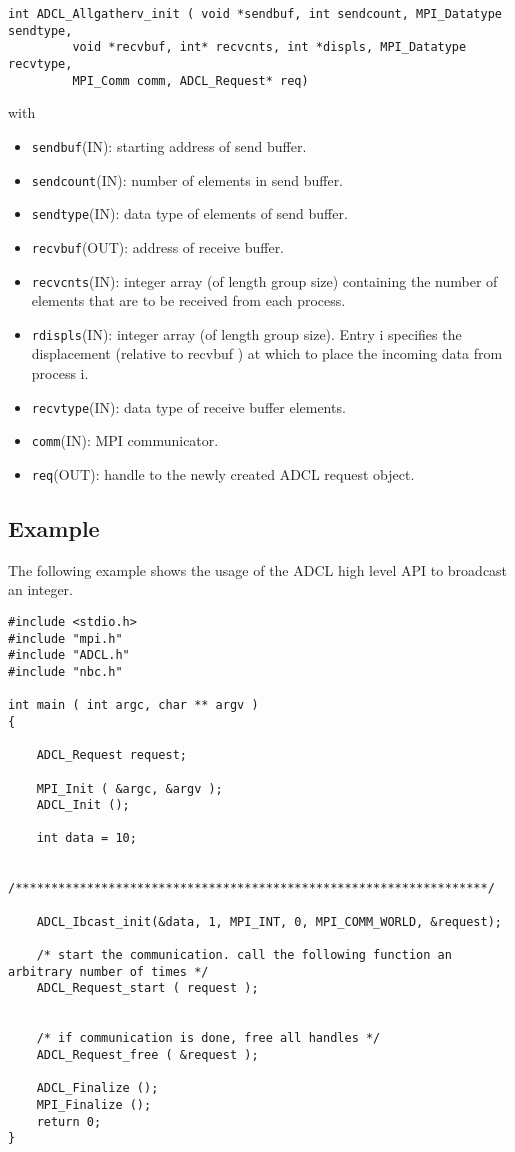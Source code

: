 \begin{verbatim}
int ADCL_Allgatherv_init ( void *sendbuf, int sendcount, MPI_Datatype sendtype,
         void *recvbuf, int* recvcnts, int *displs, MPI_Datatype recvtype,
         MPI_Comm comm, ADCL_Request* req)
\end{verbatim}
with
\begin{itemize}
\item {\tt sendbuf}(IN): starting address of send buffer.
\item {\tt sendcount}(IN): number of elements in send buffer.
\item {\tt sendtype}(IN): data type of elements of send buffer.
\item {\tt recvbuf}(OUT): address of receive buffer.
\item {\tt recvcnts}(IN): integer array (of length group size) containing the number of elements that are to be received from each process.
\item {\tt rdispls}(IN): integer array (of length group size). Entry i specifies the displacement (relative to recvbuf ) at which to place the incoming data from process i.
\item {\tt recvtype}(IN): data type of receive buffer elements.
\item {\tt comm}(IN): MPI communicator.
\item {\tt req}(OUT): handle to the newly created ADCL request object.
\end{itemize}

\subsection{Example}

The following example shows the usage of the ADCL high level API to broadcast an integer.

\begin{verbatim}
#include <stdio.h>
#include "mpi.h"
#include "ADCL.h"
#include "nbc.h"

int main ( int argc, char ** argv ) 
{
    
    ADCL_Request request;

    MPI_Init ( &argc, &argv );
    ADCL_Init ();
    
    int data = 10;
    
    /******************************************************************/

    ADCL_Ibcast_init(&data, 1, MPI_INT, 0, MPI_COMM_WORLD, &request);
    
    /* start the communication. call the following function an arbitrary number of times */ 
    ADCL_Request_start ( request );


    /* if communication is done, free all handles */
    ADCL_Request_free ( &request );
    
    ADCL_Finalize ();
    MPI_Finalize ();
    return 0;
}
\end{verbatim}
